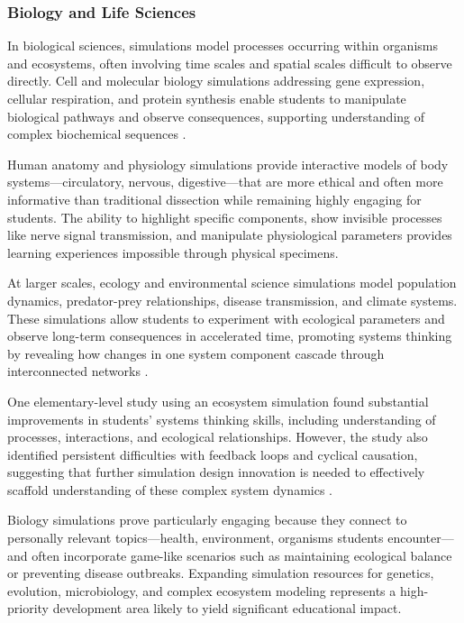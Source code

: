 \subsubsection{Biology and Life Sciences}

In biological sciences, simulations model processes occurring within organisms and ecosystems, often involving time scales and spatial scales difficult to observe directly. Cell and molecular biology simulations addressing gene expression, cellular respiration, and protein synthesis enable students to manipulate biological pathways and observe consequences, supporting understanding of complex biochemical sequences \cite{mdpi2024}.

Human anatomy and physiology simulations provide interactive models of body systems—circulatory, nervous, digestive—that are more ethical and often more informative than traditional dissection while remaining highly engaging for students. The ability to highlight specific components, show invisible processes like nerve signal transmission, and manipulate physiological parameters provides learning experiences impossible through physical specimens.

At larger scales, ecology and environmental science simulations model population dynamics, predator-prey relationships, disease transmission, and climate systems. These simulations allow students to experiment with ecological parameters and observe long-term consequences in accelerated time, promoting systems thinking by revealing how changes in one system component cascade through interconnected networks \cite{eric2009}.

One elementary-level study using an ecosystem simulation found substantial improvements in students' systems thinking skills, including understanding of processes, interactions, and ecological relationships. However, the study also identified persistent difficulties with feedback loops and cyclical causation, suggesting that further simulation design innovation is needed to effectively scaffold understanding of these complex system dynamics \cite{eric2009}.

Biology simulations prove particularly engaging because they connect to personally relevant topics—health, environment, organisms students encounter—and often incorporate game-like scenarios such as maintaining ecological balance or preventing disease outbreaks. Expanding simulation resources for genetics, evolution, microbiology, and complex ecosystem modeling represents a high-priority development area likely to yield significant educational impact.

